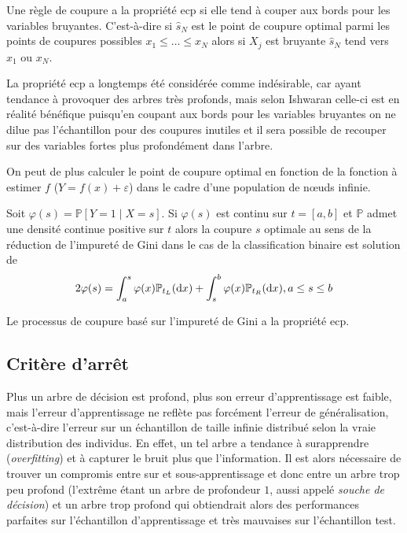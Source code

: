 \begin{definition}
    Une règle de coupure a la propriété \ac{ecp} si elle tend à couper aux bords pour les variables bruyantes. C'est-à-dire si $\hat{s}_N$ est le point de coupure optimal parmi les points de coupures possibles $x_1 \leq \dotsc \leq x_N$ alors si $X_j$ est bruyante $\hat{s}_N$ tend vers $x_1$ ou $x_N$.
\end{definition}

La propriété \ac{ecp} a longtemps été considérée comme indésirable, car ayant tendance à provoquer des arbres très profonds, mais selon Ishwaran celle-ci est en réalité bénéfique puisqu’en coupant aux bords pour les variables bruyantes on ne dilue pas l'échantillon pour des coupures inutiles et il sera possible de recouper sur des variables fortes plus profondément dans l'arbre.

On peut de plus calculer le point de coupure optimal en fonction de la fonction à estimer $f$ ($Y = f(x) + \varepsilon$) dans le cadre d'une population de nœuds infinie.

\begin{theoreme}
    Soit $\varphi (s) = \mathbb{P} [Y = 1 \mid X = s]$. Si $\varphi (s)$ est continu sur $t = [a,b]$ et $\mathbb{P}$ admet une densité continue positive sur $t$ alors la coupure $s$ optimale au sens de la réduction de l'impureté de Gini dans le cas de la classification binaire est solution de
    \begin{equation}
        2 \varphi (s) = \int_a^s \varphi (x) \mathbb{P}_{t_L} (\mathop{}\!\mathrm{d} x) + \int_s^b \varphi (x) \mathbb{P}_{t_R} (\mathop{}\!\mathrm{d} x) , a \leq s \leq b
    \end{equation}
\end{theoreme}

\begin{theoreme}
    Le processus de coupure basé sur l'impureté de Gini a la propriété \ac{ecp}.
\end{theoreme}


\subsection{Critère d'arrêt}

Plus un arbre de décision est profond, plus son erreur d'apprentissage est faible, mais l'erreur d'apprentissage ne reflète pas forcément l'erreur de généralisation, c'est-à-dire l'erreur sur un échantillon de taille infinie distribué selon la vraie distribution des individus. En effet, un tel arbre a tendance à surapprendre (\emph{overfitting}) et à capturer le bruit plus que l'information. Il est alors nécessaire de trouver un compromis entre sur et sous-apprentissage et donc entre un arbre trop peu profond (l'extrême étant un arbre de profondeur $1$, aussi appelé \emph{souche de décision}) et un arbre trop profond qui obtiendrait alors des performances parfaites sur l'échantillon d'apprentissage et très mauvaises sur l'échantillon test.


